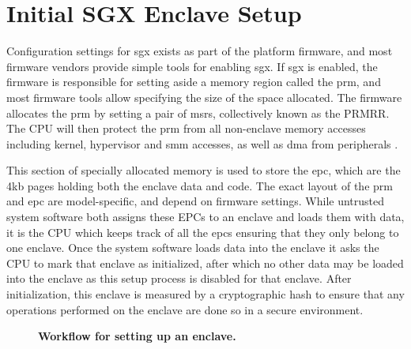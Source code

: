 \section{Initial SGX Enclave Setup}
Configuration settings for \gls{sgx} exists as part of the platform firmware, and most firmware vendors provide simple tools for enabling \gls{sgx}. If \gls{sgx} is enabled, the firmware is responsible for setting aside a memory region called the \gls{prm}, and most firmware tools allow specifying the size of the space allocated. The firmware allocates the \gls{prm} by setting a pair of \glspl{msr}, collectively known as the PRMRR. The CPU will then protect the \gls{prm} from all non-enclave memory accesses including kernel, hypervisor and \gls{smm} accesses, as well as \gls{dma} from peripherals \cite{intel-sgx-explained}. 

This section of specially allocated memory is used to store the \gls{epc}, which are the 4kb pages holding both the enclave data and code. The exact layout of the \gls{prm} and \gls{epc} are model-specific, and depend on firmware settings. While untrusted system software both assigns these EPCs to an enclave and loads them with data, it is the CPU which keeps track of all the \gls{epc}s ensuring that they only belong to one enclave. Once the system software loads data into the enclave it asks the CPU to mark that enclave as initialized, after which no other data may be loaded into the enclave as this setup process is disabled for that enclave. After initialization, this enclave is measured by a cryptographic hash to ensure that any operations performed on the enclave are done so in a secure environment.
\vspace{10 mm}

\begin{figure}[h]
\centering

\caption[Setting Up SGX]{\textbf{Workflow for setting up an enclave.}}
\label{fig:sgx_setup}
\end{figure}

